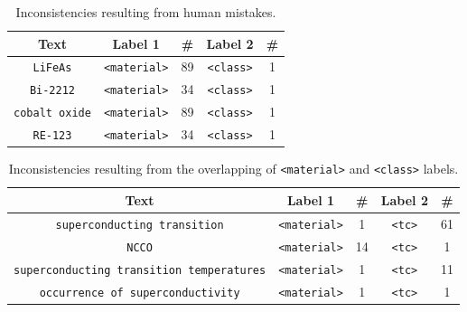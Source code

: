 \documentclass[fleqn,10pt]{wlscirep}
\begin{document}

\begin{table}[ht]
    \centering
    \begin{tabular}{ | c | c | c | c | c | } 
    \hline
        \textbf{Text} & \textbf{Label 1} & \textbf{\#} & \textbf{Label 2} & \textbf{\#}\\
    \hline
        \texttt{LiFeAs}         &   \texttt{<material>}   &    89   &   \texttt{<class>}  &   1   \\
        \texttt{Bi-2212}        &	\texttt{<material>}   &    34   &   \texttt{<class>}  &   1   \\
        \texttt{cobalt oxide}   &   \texttt{<material>}   &    89   &   \texttt{<class>}  &   1   \\
        \texttt{RE-123}         &	\texttt{<material>}   &    34   &   \texttt{<class>}  &   1   \\
    \hline
    \end{tabular}
    \caption{Inconsistencies resulting from human mistakes.}
    \label{table:dataset-inconsistencies-clear}
\end{table}


\begin{table}[ht]
    \centering
    \begin{tabular}{ | c | c | c | c | c | } 
    \hline
        \textbf{Text} & \textbf{Label 1} & \textbf{\#} & \textbf{Label 2} & \textbf{\#}\\
    \hline
        \texttt{superconducting transition}     &   \texttt{<material>}   &    1   &   \texttt{<tc>}  &   61   \\
        \texttt{NCCO}    &	\texttt{<material>}   &    14   &   \texttt{<tc>}  &   1   \\
        \texttt{superconducting transition temperatures}     &   \texttt{<material>}   &    1   &   \texttt{<tc>}  &   11   \\
        \texttt{occurrence of superconductivity}    &	\texttt{<material>}   &    1   &   \texttt{<tc>}  &   1   \\
    \hline
    \end{tabular}
    \caption{Inconsistencies resulting from the overlapping of \texttt{<material>} and \texttt{<class>} labels.}
    \label{table:dataset-inconsistencies-unclear}
\end{table}
\end{document}
